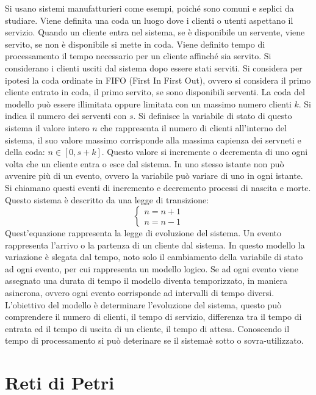 \documentclass{article}
\numberwithin{equation}{subsection}
\begin{document}
Si usano sistemi manufatturieri come esempi, poiché sono comuni e seplici da studiare. Viene definita una coda un luogo dove i clienti o utenti aspettano il servizio. Quando un 
cliente entra nel sistema, se è disponibile un servente, viene servito, se non è disponibile si mette in coda. Viene definito tempo di processamento il tempo 
necessario per un cliente affinché sia servito. Si considerano i clienti usciti dal sistema dopo essere stati serviti. Si considera per ipotesi la coda ordinate in FIFO (First 
In First Out), ovvero si considera il primo cliente entrato in coda, il primo servito, se sono disponibili serventi. La coda del modello può essere illimitata oppure 
limitata con un massimo numero clienti $k$. Si indica il numero dei serventi con $s$. Si definisce la variabile di stato di questo sistema il valore intero $n$ che 
rappresenta il numero di clienti all'interno del sistema, il suo valore massimo corrisponde alla massima capienza dei servneti e della coda: $n\in[0,s+k]$. Questo valore 
si incremente o decrementa di uno ogni volta che un cliente entra o esce dal sistema. In uno stesso istante non può avvenire più di un evento, ovvero la variabile può 
variare di uno in ogni istante. Si chiamano questi eventi di incremento e decremento processi di nascita e morte. Questo sistema è descritto da una legge di transizione:
\begin{equation*}
    \begin{cases}
        n=n+1\\
        n=n-1
    \end{cases}
\end{equation*}
Quest'equazione rappresenta la legge di evoluzione del sistema. Un evento rappresenta l'arrivo o la partenza di un cliente dal sistema. In questo modello la variazione è slegata 
dal tempo, noto solo il cambiamento della variabile di stato ad ogni evento, per cui rappresenta un modello logico. Se ad ogni evento viene assegnato una durata di tempo il 
modello diventa temporizzato, in maniera asincrona, ovvero ogni evento corrisponde ad intervalli di tempo diversi. L'obiettivo del modello è determinare l'evoluzione del sistema, 
questo può comprendere il numero di clienti, il tempo di servizio, differenza tra il tempo di entrata ed il tempo di uscita di un cliente, il tempo di attesa. Conoscendo il 
tempo di processamento si può deterinare se il sistemaè sotto o sovra-utilizzato.

\clearpage

\section{Reti di Petri}
\end{document}
